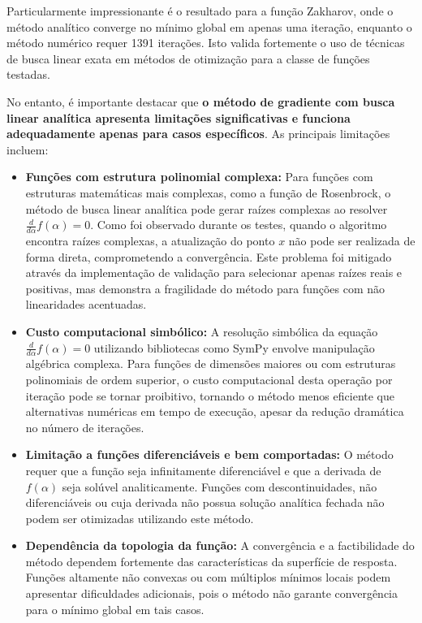 \documentclass[runningheads]{llncs}
\begin{document}
Particularmente impressionante é o resultado para a função Zakharov, onde o método analítico converge no mínimo global em apenas uma iteração, enquanto o método numérico requer 1391 iterações. Isto valida fortemente o uso de técnicas de busca linear exata em métodos de otimização para a classe de funções testadas.

No entanto, é importante destacar que \textbf{o método de gradiente com busca linear analítica apresenta limitações significativas e funciona adequadamente apenas para casos específicos}. As principais limitações incluem:

\begin{itemize}
\item \textbf{Funções com estrutura polinomial complexa:} Para funções com estruturas matemáticas mais complexas, como a função de Rosenbrock, o método de busca linear analítica pode gerar raízes complexas ao resolver $\frac{d}{d\alpha} f(\alpha) = 0$. Como foi observado durante os testes, quando o algoritmo encontra raízes complexas, a atualização do ponto $x$ não pode ser realizada de forma direta, comprometendo a convergência. Este problema foi mitigado através da implementação de validação para selecionar apenas raízes reais e positivas, mas demonstra a fragilidade do método para funções com não linearidades acentuadas.

\item \textbf{Custo computacional simbólico:} A resolução simbólica da equação $\frac{d}{d\alpha} f(\alpha) = 0$ utilizando bibliotecas como SymPy envolve manipulação algébrica complexa. Para funções de dimensões maiores ou com estruturas polinomiais de ordem superior, o custo computacional desta operação por iteração pode se tornar proibitivo, tornando o método menos eficiente que alternativas numéricas em tempo de execução, apesar da redução dramática no número de iterações.

\item \textbf{Limitação a funções diferenciáveis e bem comportadas:} O método requer que a função seja infinitamente diferenciável e que a derivada de $f(\alpha)$ seja solúvel analiticamente. Funções com descontinuidades, não diferenciáveis ou cuja derivada não possua solução analítica fechada não podem ser otimizadas utilizando este método.

\item \textbf{Dependência da topologia da função:} A convergência e a factibilidade do método dependem fortemente das características da superfície de resposta. Funções altamente não convexas ou com múltiplos mínimos locais podem apresentar dificuldades adicionais, pois o método não garante convergência para o mínimo global em tais casos.
\end{itemize}
\end{document}
